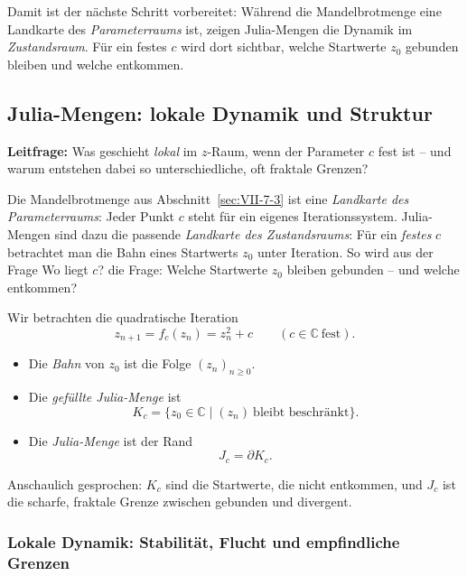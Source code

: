Damit ist der nächste Schritt vorbereitet:
Während die Mandelbrotmenge eine Landkarte des \emph{Parameterraums} ist,
zeigen Julia-Mengen die Dynamik im \emph{Zustandsraum}.
Für ein festes \(c\) wird dort sichtbar,
welche Startwerte \(z_0\) gebunden bleiben
und welche entkommen.


\subsection{Julia-Mengen: lokale Dynamik und Struktur}
\label{sec:julia-mengen}

\textbf{Leitfrage:} Was geschieht \emph{lokal} im $z$-Raum, wenn der Parameter $c$ fest ist -- und warum entstehen dabei so unterschiedliche, oft fraktale Grenzen?

Die Mandelbrotmenge aus Abschnitt~\ref{sec:VII-7-3} ist eine \emph{Landkarte des Parameterraums}:
Jeder Punkt $c$ steht für ein eigenes Iterationssystem.
Julia-Mengen sind dazu die passende \emph{Landkarte des Zustandsraums}:
Für ein \emph{festes} $c$ betrachtet man die Bahn eines Startwerts $z_0$ unter Iteration.
So wird aus der Frage
\glqq Wo liegt $c$?\grqq{}
die Frage:
\glqq Welche Startwerte $z_0$ bleiben gebunden -- und welche entkommen?\grqq

\begin{MathBox}
\label{box:iteration}
Wir betrachten die quadratische Iteration
\[
z_{n+1}=f_c(z_n)=z_n^2+c \qquad (c\in\mathbb{C}\ \text{fest}).
\]
\begin{itemize}
	\item Die \emph{Bahn} von $z_0$ ist die Folge $(z_n)_{n\ge 0}$.
	\item Die \emph{gefüllte Julia-Menge} ist
	\[
	K_c=\{z_0\in\mathbb{C}\mid (z_n)\ \text{bleibt beschränkt}\}.
	\]
	\item Die \emph{Julia-Menge} ist der Rand
	\[
	J_c=\partial K_c.
	\]
\end{itemize}
Anschaulich gesprochen:
$K_c$ sind die Startwerte, die nicht entkommen,
und $J_c$ ist die scharfe, fraktale Grenze zwischen gebunden und divergent.
\end{MathBox}

\subsubsection*{Lokale Dynamik: Stabilität, Flucht und empfindliche Grenzen}

